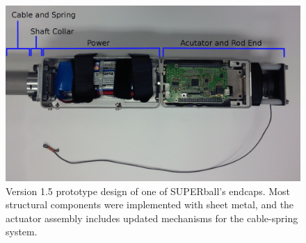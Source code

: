 \documentclass[12pt]{report}
\begin{document}
\begin{figure}[thpb]
      \centering
      \includegraphics[width=0.9\columnwidth]{img/subsystem_end-cap_cropped.jpg}
      \caption{Version 1.5 prototype design of one of SUPERball's endcaps. Most structural components were implemented with sheet metal, and the actuator assembly includes updated mechanisms for the cable-spring system.~\cite{sabelhaus2014hardware}}
      \label{fig:strut_prototype}
      \vspace{-0.2cm}
\end{figure}
\end{document}

